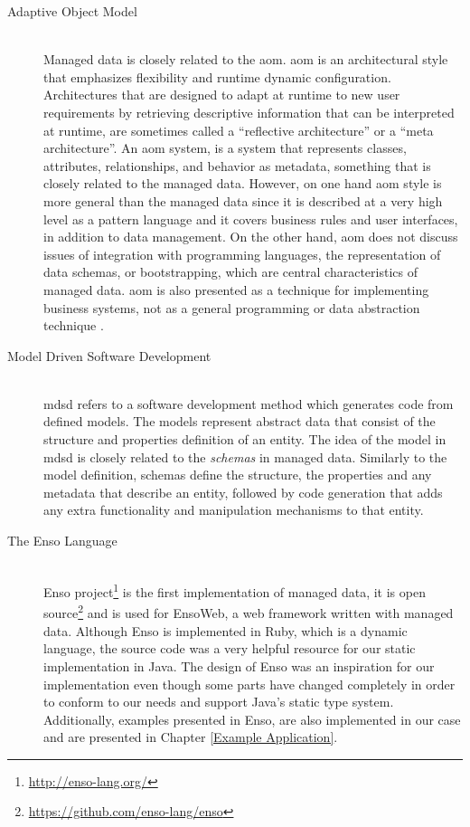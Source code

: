 \begin{description}
  \item[Adaptive Object Model]~\\
  Managed data \cite{loh2012managed} is closely related to the \ac{aom}. \ac{aom} \cite{yoder2002adaptive} is an architectural style that emphasizes flexibility and runtime dynamic configuration. 
  Architectures that are designed to adapt at runtime to new user requirements by retrieving descriptive information that can be interpreted at runtime, are sometimes called a ``reflective architecture'' or a ``meta architecture''. 
  An \ac{aom} system, is a system that represents classes, attributes, relationships, and behavior as metadata, something that is closely related to the managed data.
  However, on one hand \ac{aom} style is more general than the managed data since it is described at a very high level as a pattern language and it covers business rules and user interfaces, in addition to data management. 
  On the other hand, \ac{aom} does not discuss issues of integration with programming languages, the representation of data schemas, or bootstrapping, which are central characteristics of managed data. 
  \ac{aom} is also presented as a technique for implementing business systems, not as a general programming or data abstraction technique \cite{loh2012managed}.

  \item[Model Driven Software Development]~\\
  \ac{mdsd} refers to a software development method which generates code from defined models. 
  The models represent abstract data that consist of the structure and properties definition of an entity.
  The idea of the model in \ac{mdsd} is closely related to the \textit{schemas} in managed data.
  Similarly to the model definition, schemas define the structure, the properties and any metadata that describe an entity, followed by code generation that adds any extra functionality and manipulation mechanisms to that entity.

  \item[The Enso Language]~\\
  Enso project\footnote{\url{http://enso-lang.org/}} is the first implementation of managed data, 
  it is open source\footnote{\url{https://github.com/enso-lang/enso}} and is used for EnsoWeb, a web framework written with managed data.
  Although Enso is implemented in Ruby, which is a dynamic language, the source code was a very helpful resource for our static implementation in Java. 
  The design of Enso was an inspiration for our implementation even though some parts have changed completely in order to conform to our needs and support Java's static type system.
  Additionally, examples presented in Enso, are also implemented in our case and are presented in Chapter \ref{Example Application}.


\end{description}
